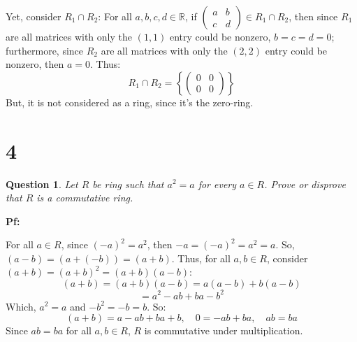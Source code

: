 \documentclass{article}
\newtheorem{question}{Question}
\begin{document}
\hfill

Yet, consider $R_1\cap R_2$: For all $a,b,c,d\in\mathbb{R}$, if $\begin{pmatrix}
    a&b\\c&d
\end{pmatrix} \in R_1\cap R_2$, then since $R_1$ are all matrices with only the $(1,1)$ entry could be nonzero, $b=c=d = 0$;
furthermore, since $R_2$ are all matrices with only the $(2,2)$ entry could be nonzero, then $a=0$. Thus:
$$R_1\cap R_2 = \left\{\begin{pmatrix}
    0&0\\0&0
\end{pmatrix}
\right\}$$
But, it is not considered as a ring, since it's the zero-ring.

\hfill

\hfill

\hfill

\section*{4}
\begin{question}
    Let $R$ be ring such that $a^2=a$ for every $a\in R$. Prove or disprove that $R$ is a
commutative ring.
\end{question}

\textbf{Pf:}

For all $a\in R$, since $(-a)^2=a^2$, then $-a=(-a)^2=a^2=a$. So, $(a-b)=(a+(-b))=(a+b)$. Thus, for all $a,b\in R$, consider $(a+b)=(a+b)^2 = (a+b)(a-b)$:
$$(a+b)=(a+b)(a-b) = a(a-b)+b(a-b)$$
$$ = a^2-ab+ba-b^2$$
Which, $a^2=a$ and $-b^2 = -b = b$. So:
$$(a+b)=a-ab+ba+b,\quad 0 = -ab+ba,\quad ab=ba$$
Since $ab=ba$ for all $a,b\in R$, $R$ is commutative under multiplication.
\end{document}
